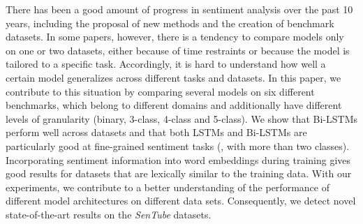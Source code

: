 There has been a good amount of progress in sentiment analysis over the past 10 years, including the proposal of new methods and the creation of benchmark datasets. In some papers, however, there is a tendency to compare models only on one or two datasets, either because of time restraints or because the model is tailored to a specific task. Accordingly, it is hard to understand how well a certain model generalizes across different tasks and datasets. In this paper, we contribute to this situation by comparing several models on six different benchmarks, which belong to different domains and additionally have different levels of granularity (binary, 3-class, 4-class and 5-class). We show that Bi-LSTMs perform well across datasets and that both LSTMs and Bi-LSTMs are particularly good at fine-grained sentiment tasks (\ie, with more than two classes). Incorporating sentiment information into word embeddings during training gives good results for datasets that are lexically similar to the training data. With our experiments, we contribute to a better understanding of the performance of different model architectures on different data sets. Consequently, we detect novel state-of-the-art results on the \textit{SenTube} datasets.

